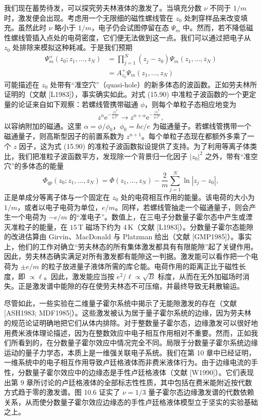 我们现在蓄势待发，可以探究劳夫林液体的激发了。当填充分数 $\nu$ 不同于 $1/m$ 时，激发便会出现。考虑用一个无限细的磁性螺线管在 $z_{0}$ 处刺穿样品来改变填充。虽然此时 $\nu$ 略小于 $1/m$，电子仍会试图停留在态 $\Psi_{m}$ 中。然而，若不降低磁性螺线管插入点处的电荷密度，它们便无法做到这一点。我们可以通过把电子从 $z_{0}$ 处排除来模拟这种耗减。于是我们预期
\begin{align*}
\Psi_{m}^{+}(z_{0};z_{1},\ldots,z_{N})&=\prod_{j=1}^{N}(z_{j}-z_{0})\Psi_{m}(z_{1},\ldots,z_{N})\\
&=A_{z_{0}}^{+}\Psi_{m}(z_{1},\ldots,z_{N})\tag{15.90}
\end{align*}
可能描述在 $z_{0}$ 处带有“准空穴”（quasi-hole）的新多体态的波函数。正如劳夫林所证明的（文献 [L1983]），事实确实如此。对式 (15.90) 中准粒子波函数的一个更定量的论证来自如下观察：若螺线管携带磁通 $\phi$，则每个单粒子态相应地变为
\begin{equation*}
z^{n}\mathrm{e}^{-\frac{|z|^{2}}{4\ell^{2}}}\to z^{n+\alpha}\mathrm{e}^{-\frac{|z|^{2}}{4\ell^{2}}},\tag{15.91}
\end{equation*}
以容纳附加的磁通。这里 $\alpha=\phi/\phi_{0}$，$\phi_{0}=hc/e$ 为磁通量子。若螺线管携带一个磁通量子，则高斯型因子的前置系数为 $z^{n+1}$。每个单粒子态现在都额外多乘了一个 $z$ 因子，这为式 (15.90) 的准粒子波函数拟设提供了支持。为了利用等离子体类比，我们把准粒子波函数平方，发现除一个背景归一化因子 $|z_{0}|^{2}$ 之外，带有“准空穴”的多体态的能量
\begin{equation*}
\Phi_{qp}(z_{0};z_{1},\ldots,z_{N})=\Phi(z_{1},\ldots,z_{N})-\frac{2}{m}\sum_{j=1}^{N}\ln|z_{j}-z_{0}|,\tag{15.92}
\end{equation*}
正是单成分等离子体与一个固定在 $z_{0}$ 处的电荷相互作用的能量。该电荷的大小为 $1/m$，或者以电子电荷为单位，$e/m$。同样，若螺线管抽走一个磁通量子，则会产生一个电荷为 $-e/m$ 的“准电子”。数值上，在三电子分数量子霍尔态中产生或湮灭准粒子的能量，在 $15\,\mathrm{T}$ 磁场下约为 $4\,\mathrm{K}$（文献 [L1983]）。分数量子霍尔态能隙的改进估算由 Girvin、MacDonald 与 Platzman 给出（文献 [GMP1985]）。事实上，他们的工作对确立“劳夫林态的所有集体激发都具有有限能隙”起了关键作用。因此，劳夫林态确实满足对所有激发都有能隙这一判据。激发能可以看作把一个电荷为 $\pm e/m$ 的粒子放进量子液体所需的库仑能。电荷作用的距离正比于磁性长度，即 $\propto\ell$。因此，激发能应当按 $e^{2}/\ell\propto\sqrt{B}$ 标度，从而在无外加磁场时消失。正是激发谱中能隙的存在使劳夫林态不可压缩，并最终导致无耗散输运。

尽管如此，一些实验在二维量子霍尔系统中揭示了无能隙激发的存在（文献 [ASH1983; MDF1985]）。这些激发被认为居于量子霍尔系统的边缘，因为劳夫林的规范论证明确地把它们从体内排除。对于整数量子霍尔态，边缘激发可以很好地用费米液体理论描述，因为在整数效应中电子相互作用相对不重要。然而，正如我们所看到的，在分数量子霍尔效应中情况完全不同。局限于分数量子霍尔系统边缘运动的量子力学态，本质上是一维强关联电子系统。我们在第 10 章中已经证明，一维系统中的电子相互作用导致卢廷格液体而非费米液体行为。由于边缘电流的手性，分数量子霍尔效应中的边缘态是手性卢廷格液体（文献 [W1990]）。它们表现出第 9 章所讨论的卢廷格液体的全部标志性性质，其中包括在费米能附近按代数方式趋于零的激发谱。图 10.6 证实了 $\nu=1/3$ 量子霍尔态边缘激发谱的代数依赖关系，从而使分数量子霍尔效应边缘态的手性卢廷格液体模型立于坚实的实验基础之上。

